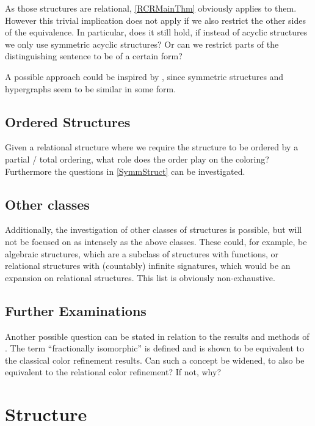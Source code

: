 \documentclass[a4paper,11pt,DIV=15]{scrartcl} %
\theoremstyle{plain}
\theoremstyle{definition}
\begin{document}
As those structures are relational, \cref{RCRMainThm} obviously applies to them.
However this trivial implication does not apply if we also restrict the other sides of the equivalence.
In particular, does it still hold, if instead of acyclic structures we only use symmetric acyclic structures?
Or can we restrict parts of the distinguishing sentence to be of a certain form?

A possible approach could be inspired by \cite{scheidt2023counting}, since symmetric structures and hypergraphs seem to be similar in some form.
\label{SymmStruct}

\subsection{Ordered Structures}

Given a relational structure where we require the structure to be ordered by a partial / total ordering, what role does the order play on the coloring?
Furthermore the questions in \cref{SymmStruct} can be investigated.

\subsection{Other classes}

Additionally, the investigation of other classes of structures is possible, but will not be focused on as intensely as the above classes.
These could, for example, be algebraic structures, which are a subclass of structures with functions, or relational structures with (countably) infinite signatures, which would be an expansion on relational structures.
This list is obviously non-exhaustive.

\subsection{Further Examinations}

Another possible question can be stated in relation to the results and methods of \cite{dell2018lov}.
The term ``fractionally isomorphic'' is defined and is shown to be equivalent to the classical color refinement results.
Can such a concept be widened, to also be equivalent to the relational color refinement?
If not, why?

\section{Structure}
\end{document}

